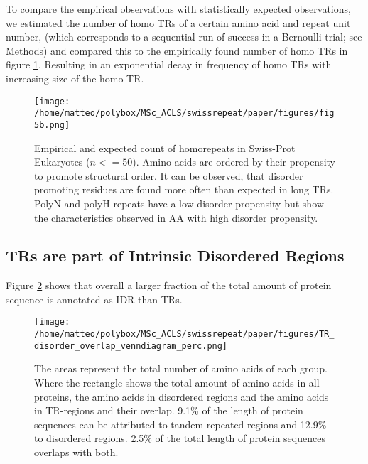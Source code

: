 \documentclass[a4,center,fleqn]{NAR}
\begin{document}
To compare the empirical observations with statistically expected observations, we estimated the number of homo TRs of a certain amino acid and repeat unit number, (which corresponds to a sequential run of success in a Bernoulli trial; see Methods) and compared this to the empirically found number of homo TRs in figure \ref{fig5b}.
Resulting in an exponential decay in frequency of homo TRs with increasing size of the homo TR.

\begin{figure}[t]
\begin{center}
\texttt{[image: /home/matteo/polybox/MSc\_ACLS/swissrepeat/paper/figures/fig5b.png]}
\end{center}
\caption{Empirical and expected count of homorepeats in Swiss-Prot Eukaryotes ($n <= 50$). Amino acids are ordered by their propensity to promote structural order. It can be observed, that disorder promoting residues are found more often than expected in long TRs. PolyN and polyH repeats have a low disorder propensity but show the characteristics observed in AA with high disorder propensity.}
\label{fig5b}
\end{figure}



\subsection{TRs are part of Intrinsic Disordered Regions}
Figure \ref{venn} shows that overall a larger fraction of the total amount of protein sequence is annotated as IDR than TRs.

\begin{figure}[t]
\begin{center}
\texttt{[image: /home/matteo/polybox/MSc\_ACLS/swissrepeat/paper/figures/TR\_disorder\_overlap\_venndiagram\_perc.png]}
\end{center}
\caption{The areas represent the total number of amino acids of each group. Where the rectangle shows the total amount of amino acids in all proteins, the amino acids in disordered regions and the amino acids in TR-regions and their overlap. 9.1\% of the length of protein sequences can be attributed to tandem repeated regions and 12.9\% to disordered regions. 2.5\% of the total length of protein sequences overlaps with both.}
\label{venn}
\end{figure}
\end{document}
